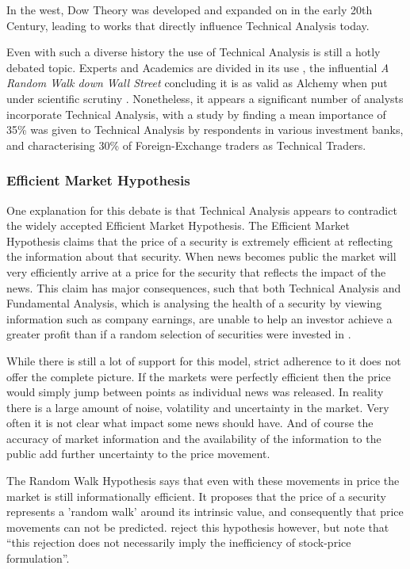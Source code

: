 \documentclass{article}
\theoremstyle{definition}
\begin{document}
In the west, Dow Theory was developed and expanded on in the early 20th Century, leading to works \citep{edwards2012technical} that directly influence Technical Analysis today.

Even with such a diverse history the use of Technical Analysis is still a hotly debated topic. Experts and Academics are divided in its use \citep{foundations}, the influential \textit{A Random Walk down Wall Street} concluding it is as valid as Alchemy when put under scientific scrutiny \cite[p.159]{randomwalk2012}. Nonetheless, it appears a significant number of analysts incorporate Technical Analysis, with a study by \cite{examininguse1997} finding a mean importance of 35\% was given to Technical Analysis by respondents in various investment banks, and \cite{cheung2000currency} characterising 30\% of Foreign-Exchange traders as Technical Traders. 

\subsubsection{Efficient Market Hypothesis}

One explanation for this debate is that Technical Analysis appears to contradict the widely accepted Efficient Market Hypothesis. The Efficient Market Hypothesis claims that the price of a security is extremely efficient at reflecting the information about that security. When news becomes public the market will very efficiently arrive at a price for the security that reflects the impact of the news. This claim has major consequences, such that both Technical Analysis and Fundamental Analysis, which is analysing the health of a security by viewing information such as company earnings, are unable to help an investor achieve a greater profit than if a random selection of securities were invested in \citep{emhAndCritics}. 

While there is still a lot of support for this model, strict adherence to it does not offer the complete picture. If the markets were perfectly efficient then the price would simply jump between points as individual news was released. In reality there is a large amount of noise, volatility and uncertainty in the market. Very often it is not clear what impact some news should have. And of course the accuracy of market information and the availability of the information to the public add further uncertainty to the price movement.

The Random Walk Hypothesis says that even with these movements in price the market is still informationally efficient. It proposes that the price of a security represents a 'random walk' around its intrinsic value, and consequently that price movements can not be predicted. \cite{lo1988} reject this hypothesis however, but note that ``this rejection does not necessarily imply the inefficiency of stock-price formulation''.
\end{document}
